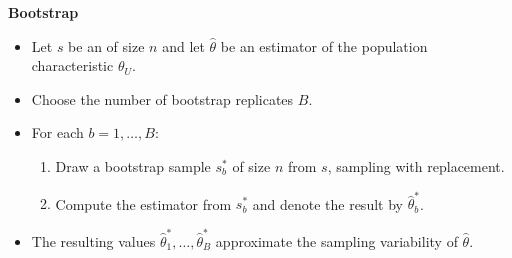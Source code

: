 \documentclass{my_eth_beamer}
\numberwithin{equation}{section}
\begin{document}
\begin{frame}
    \noindent\textcolor{fhnwblue}{\bfseries \large Bootstrap}

    \vspace{0.5em}

    \begin{itemize}
    \setlength{\itemsep}{12pt}
        \item Let $s$ be an \SRS of size $n$ and let $\widehat{\theta}$ be an
            estimator of the population characteristic $\theta_U$.
        \item Choose the number of \alert{bootstrap replicates} $B$.
        \item For each $b = 1, \ldots, B$:
            \vspace{0.25em}
            \begin{enumerate}
            \setlength{\itemsep}{7pt}
                \item Draw a \alert{bootstrap sample} $s_b^*$ of size $n$
                    from $s$, sampling \alert{with replacement}.
                \item Compute the estimator from $s_b^*$ and denote the result
                    by $\widehat{\theta}_b^*$.
            \end{enumerate}
        \item The resulting values
            $\widehat{\theta}_1^*,\ldots,\widehat{\theta}_B^*$
            approximate the sampling variability of $\widehat{\theta}$.
    \end{itemize}
\end{frame}
\end{document}
